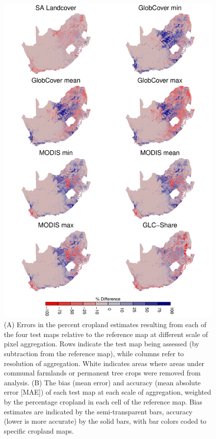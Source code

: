 \documentclass[a4paper]{article}
\begin{document}
\begin{figure}[!ht]
\centerline{\includegraphics[width=1\textwidth]{figures/figure1.pdf}}
\vspace{-0.15 cm}
\caption{(A) Errors in the percent cropland estimates resulting from each of the four test maps relative to the reference map at different scale of pixel aggregation. Rows indicate the test map being assessed (by subtraction from the reference map), while columns refer to resolution of aggregation. White indicates areas where areas under communal farmlands or permanent tree crops were removed from analysis. (B) The bias (mean error) and accuracy (mean absolute error [MAE]) of each test map at each scale of aggregation, weighted by the percentage cropland in each cell of the reference map. Bias estimates are indicated by the semi-transparent bars, accuracy (lower is more accurate) by the solid bars, with bar colors coded to specific cropland maps.}
\label{afoto1}
\end{figure}
\end{document}
